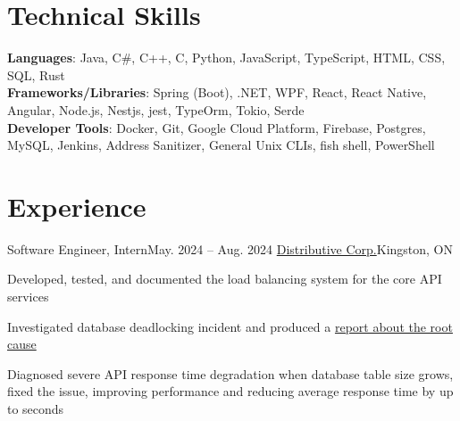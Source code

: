 \section{Technical Skills}
\vspace{0.1em}
\begin{itemize}[leftmargin=0em, label={}]
    \small{\item{
        \textbf{Languages}{: Java, C\#, C++, C, Python, JavaScript, TypeScript, HTML, CSS, SQL, Rust} \\
        \textbf{Frameworks/Libraries}{: Spring (Boot), .NET, WPF, React, React Native, Angular, Node.js, Nestjs, jest, TypeOrm, Tokio, Serde} \\
        \textbf{Developer Tools}{: Docker, Git, Google Cloud Platform, Firebase, Postgres, MySQL, Jenkins, Address Sanitizer, General Unix CLIs, fish shell, PowerShell} \\
    }}
\end{itemize}


\section{Experience}
\workEntry
{Software Engineer, Intern}{May. 2024 -- Aug. 2024}
{\href{https://distributive.network/}{\linkIcon{} Distributive Corp.}}{Kingston, ON}
\begin{ResumeItem}
    \item{Developed, tested, and documented the load balancing system for the core API services}
    \item{Investigated database deadlocking incident and produced a \linkIcon{}
        \href{https://liangw.com/mysql-read-commited-gap-lock.html}{report about the root cause}
    }
    \item{Diagnosed severe API response time degradation when database table size grows, fixed the issue, improving performance and reducing average response time by up to seconds}
\end{ResumeItem}

